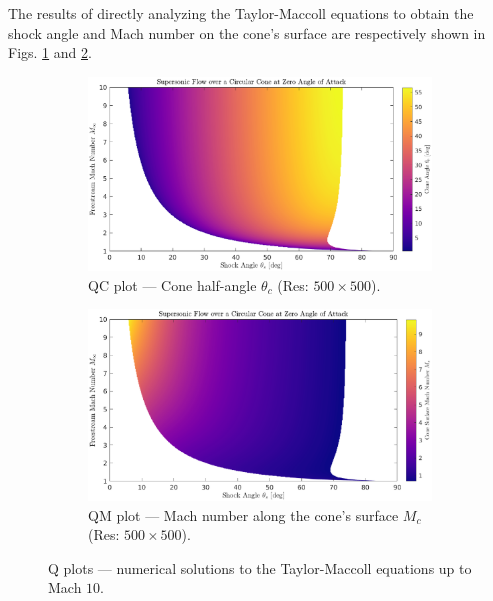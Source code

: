 \documentclass[11pt,dvipsnames]{thesis}
\begin{document}
The results of directly analyzing the Taylor-Maccoll equations to obtain the shock angle and Mach number on the cone's surface are respectively shown in Figs. \ref{fig:TaylorMaccollQC} and \ref{fig:TaylorMaccollQM}.
\begin{figure}[H]
  \centering
  \begin{subfigure}[b]{\linewidth}
    \includegraphics[width=\linewidth]{TheInvTaylorMaccollGrid500x500}
    \caption{QC plot --- Cone half-angle $\theta_c$ (Res: $500 \times 500$).}%
    \label{fig:TaylorMaccollQC}
  \end{subfigure}
  \begin{subfigure}[b]{\linewidth}
    \includegraphics[width=\linewidth]{TheInvTaylorMaccollGridMc500x500}
    \caption{QM plot --- Mach number along the cone's surface $M_c$ (Res: $500 \times 500$).}%
    \label{fig:TaylorMaccollQM}
  \end{subfigure}
  \caption{Q plots --- numerical solutions to the Taylor-Maccoll equations up to Mach $10$.}
  \label{fig:TaylorMaccollQ}
\end{figure}
\end{document}
